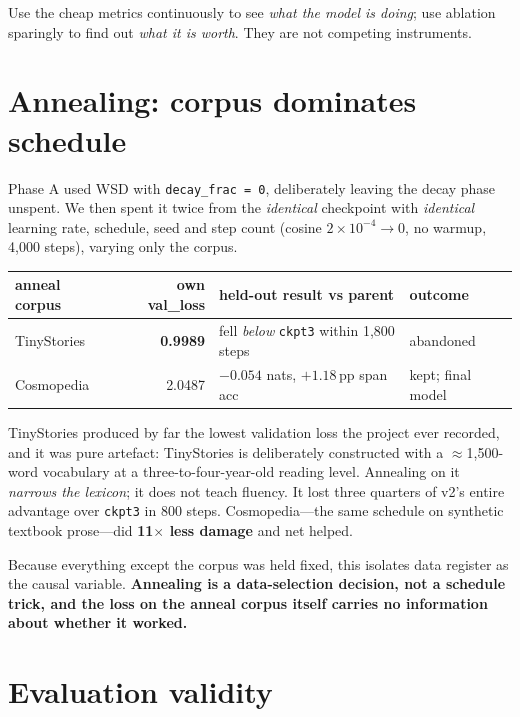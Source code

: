\documentclass[11pt,a4paper]{article}
\begin{document}
Use the cheap metrics continuously to see \emph{what the model is doing}; use ablation sparingly
to find out \emph{what it is worth}. They are not competing instruments.

\section{Annealing: corpus dominates schedule}\label{sec:anneal}

Phase A used WSD with \texttt{decay\_frac = 0}, deliberately leaving the decay phase unspent. We
then spent it twice from the \emph{identical} checkpoint with \emph{identical} learning rate,
schedule, seed and step count (cosine $2\times10^{-4} \to 0$, no warmup, 4{,}000 steps),
varying only the corpus.

\begin{center}\small
\begin{tabular}{lrll}
\toprule
anneal corpus & own val\_loss & held-out result vs parent & outcome \\
\midrule
TinyStories & \textbf{0.9989} & fell \emph{below} \texttt{ckpt3} within 1{,}800 steps & abandoned \\
Cosmopedia  & 2.0487 & $-0.054$ nats, $+1.18$\,pp span acc & kept; final model \\
\bottomrule
\end{tabular}
\end{center}

TinyStories produced by far the lowest validation loss the project ever recorded, and it was
pure artefact: TinyStories is deliberately constructed with a $\approx$1{,}500-word vocabulary
at a three-to-four-year-old reading level. Annealing on it \emph{narrows the lexicon}; it does
not teach fluency. It lost three quarters of v2's entire advantage over \texttt{ckpt3} in 800
steps. Cosmopedia---the same schedule on synthetic textbook prose---did \textbf{11$\times$ less
damage} and net helped.

Because everything except the corpus was held fixed, this isolates data register as the causal
variable. \textbf{Annealing is a data-selection decision, not a schedule trick, and the loss on
the anneal corpus itself carries no information about whether it worked.}

\section{Evaluation validity}\label{sec:evalvalid}
\end{document}
